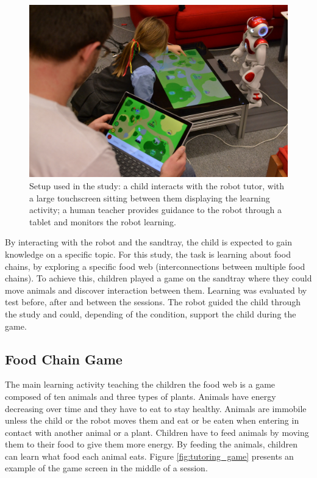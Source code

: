 \begin{figure}[ht]
	\centering
	\includegraphics[width=.5\textwidth]{setup.jpg}
	\caption{Setup used in the study: a child interacts with the robot tutor, with a large touchscreen sitting between them displaying the learning activity; a human teacher provides guidance to the robot through a tablet and monitors the robot learning.}
	\label{fig:tutoring_setup}
\end{figure}

By interacting with the robot and the sandtray, the child is expected to gain knowledge on a specific topic. For this study, the task is learning about food chains, by exploring a specific food web (interconnections between multiple food chains). To achieve this, children played a game on the sandtray where they could move animals and discover interaction between them. Learning was evaluated by test before, after and between the sessions. The robot guided the child through the study and could, depending of the condition, support the child during the game.

\subsection{Food Chain Game}

The main learning activity teaching the children the food web is a game composed of ten animals and three types of plants. Animals have energy decreasing over time and they have to eat to stay healthy. Animals are immobile unless the child or the robot moves them and eat or be eaten when entering in contact with another animal or a plant. Children have to feed animals by moving them to their food to give them more energy. By feeding the animals, children can learn what food each animal eats. Figure \ref{fig:tutoring_game} presents an example of the game screen in the middle of a session.

